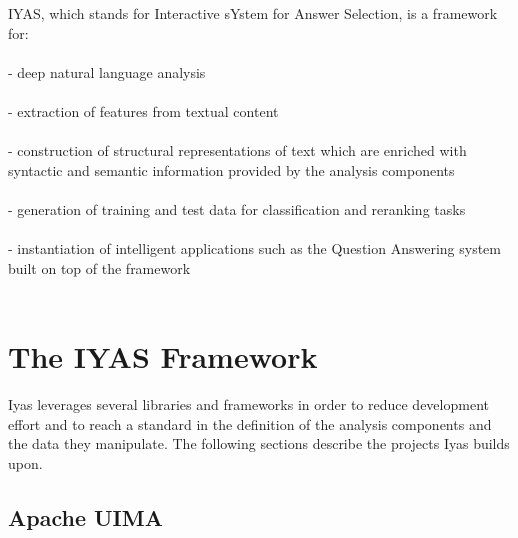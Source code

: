 \documentclass{wileysev}
\begin{document}
IYAS, which stands for Interactive sYstem for Answer Selection, is a framework for:
\\\\
- deep natural language analysis
\\\\
- extraction of features from textual content
\\\\
- construction of structural representations of text which are enriched with syntactic and semantic information provided by the analysis components
\\\\
- generation of training and test data for classification and reranking tasks
\\\\
- instantiation of intelligent applications such as the Question Answering system built on top of the framework
\\\\

\section[The IYAS Framework]{The IYAS Framework}

Iyas leverages several libraries and frameworks in order to reduce development effort and to reach a standard in the definition of the analysis components and the data they manipulate. The following sections describe the projects Iyas builds upon.

\subsection[Apache UIMA]{Apache UIMA}
\end{document}
